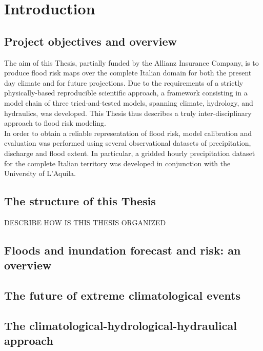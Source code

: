 \chapter{Introduction}

\section{Project objectives and overview}
The aim of this Thesis, partially funded by the Allianz Insurance Company, is to produce flood risk maps over the complete Italian domain for both the present day climate and for future projections. Due to the requirements of a strictly physically-based reproducible scientific approach, a framework consisting in a model chain of three tried-and-tested models, spanning climate, hydrology, and hydraulics, was developed. This Thesis thus describes a truly inter-disciplinary approach to flood risk modeling.\\
In order to obtain a reliable representation of flood risk, model calibration and evaluation was performed using several observational datasets of precipitation, discharge and flood extent. In particular, a gridded hourly precipitation dataset for the complete Italian territory was developed in conjunction with the University of L'Aquila.

\section{The structure of this Thesis}
DESCRIBE HOW IS THIS THESIS ORGANIZED

\section{Floods and inundation forecast and risk: an overview}

\section{The future of extreme climatological events}

\section{The climatological-hydrological-hydraulical approach}
